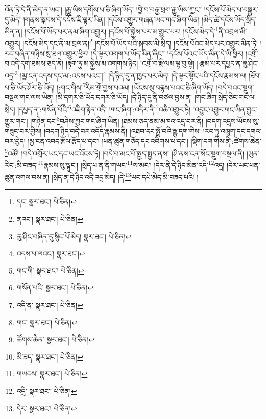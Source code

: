 འོན་ཏེ་དེ་ནི་མེད་ན་ཡང་། །རྒྱུ་ཡིས་དགོས་པ་ཅི་ཞིག་ཡོད། །བྱེ་བ་བརྒྱ་ཕྲག་རྒྱུ་ཡིས་ཀྱང་། །དངོས་པོ་མེད་པ་བསྒྱུར་དུ་མེད། །གནས་སྐབས་དེ་དངོས་ཇི་ལྟར་ཡིན། །དངོས་འགྱུར་གཞན་ཡང་གང་ཞིག་ཡིན། །མེད་ཚེ་དངོས་ཡོད་སྲིད་མིན་ན། །དངོས་པོ་ཡོད་པར་ནམ་ཞིག་འགྱུར། །དངོས་པོ་སྐྱེས་པར་མ་གྱུར་པར། །དངོས་མེད་དེ་\footnote{དང་  སྣར་ཐང་།  པེ་ཅིན། }ནི་འབྲལ་མི་འགྱུར། །དངོས་མེད་དང་ནི་མ་བྲལ་ན།\footnote{ནའང་།  སྣར་ཐང་།  པེ་ཅིན། } །དངོས་པོ་ཡོད་པའི་སྐབས་མི་སྲིད། །དངོས་པོའང་མེད་པར་འགྱུར་མིན་ཏེ། །རང་བཞིན་གཉིས་སུ་ཐལ་འགྱུར་ཕྱིར། །དེ་ལྟར་འགག་པ་ཡོད་མིན་ཞིང་། །དངོས་པོའང་ཡོད་མིན་དེ་ཡི་ཕྱིར། །འགྲོ་བ་འདི་དག་ཐམས་ཅད་ནི། །རྟག་ཏུ་མ་སྐྱེས་མ་འགགས་ཉིད། །འགྲོ་བ་རྨི་ལམ་ལྟ་བུ་སྟེ། །:རྣམ་པར་དཔྱད་ན་ཆུ་ཤིང་འདྲ།\footnote{ཆུ་ཤིང་བཞིན་དུ་སྙིང་པོ་མེད།  སྣར་ཐང་།  པེ་ཅིན། } །མྱ་ངན་འདས་དང་མ་:འདས་པའང་།\footnote{འདས་པ་ལའང་།  སྣར་ཐང་། } །དེ་ཉིད་དུ་ན་ཁྱད་པར་མེད། །དེ་ལྟར་སྟོང་པའི་དངོས་རྣམས་ལ། །ཐོབ་པ་ཅི་ཡོད་ཤོར་ཅི་ཡོད། །:གང་གིས་\footnote{གང་གི་  སྣར་ཐང་།  པེ་ཅིན། }རིམ་གྲོ་བྱས་པའམ། །ཡོངས་སུ་བརྙས་པའང་ཅི་ཞིག་ཡོད། །བདེ་བའང་སྡུག་བསྔལ་གང་ལས་ཡིན། །མི་དགར་ཅི་ཡོད་དགར་ཅི་ཡོད། །དེ་ཉིད་དུ་ནི་བཙལ་བྱས་ན། །གང་ཞིག་སྲེད་ཅིང་གང་ལ་སྲེད། །དཔྱད་ན་:གསོན་པོའི་\footnote{གསོན་པའི་  སྣར་ཐང་།  པེ་ཅིན། }འཇིག་རྟེན་འདི། །གང་ཞིག་:འདིར་ནི་\footnote{འདི་ན་  སྣར་ཐང་།  པེ་ཅིན། }འཆི་འགྱུར་ཏེ། །འབྱུང་འགྱུར་གང་ཡིན་བྱུང་གྱུར་གང་། །གཉེན་དང་\footnote{གང་  སྣར་ཐང་།  པེ་ཅིན། }བཤེས་ཀྱང་གང་ཞིག་ཡིན། །ཐམས་ཅད་ནམ་མཁའ་འདྲ་བར་ནི། །བདག་འདྲས་ཡོངས་སུ་གཟུང་བར་གྱིས། །བདག་ཉིད་བདེ་བར་འདོད་རྣམས་ནི། །འཐབ་དང་སྤྲོ་བའི་རྒྱུ་དག་གིས། །རབ་ཏུ་འཁྲུག་དང་དགའ་བར་བྱེད། །མྱ་ངན་འབད་རྩོལ་རྩོད་པ་དང་། །ཕན་ཚུན་གཅོད་དང་འབིགས་པ་དང་། །སྡིག་དག་གིས་ནི་:ཚེགས་ཆེན་\footnote{ཚོགས་ཆེན་  སྣར་ཐང་།  པེ་ཅིན། }འཚོ། །བདེ་འགྲོར་ཡང་དང་ཡང་འོངས་ཏེ། །བདེ་བ་མང་པོ་སྤྱད་སྤྱད་ནས། །ཤི་ནས་ངན་སོང་སྡུག་བསྔལ་ནི། །ཡུན་རིང་:མི་བཟད་\footnote{མི་ཟད་  སྣར་ཐང་།  པེ་ཅིན། }རྣམས་སུ་ལྟུང་། །སྲིད་པ་ན་ནི་གཡང་\footnote{གཡངས་  སྣར་ཐང་།  པེ་ཅིན། }ས་མང་། །དེར་ནི་དེ་ཉིད་མིན་འདི་\footnote{འདྲི་  སྣར་ཐང་།  པེ་ཅིན། }འདྲ། །དེར་ཡང་ཕན་ཚུན་འགལ་བས་ན། །སྲིད་ན་དེ་ཉིད་འདི་འདྲ་མེད། །དེ་\footnote{དེར་  སྣར་ཐང་།  པེ་ཅིན། }ཡང་དཔེ་མེད་མི་བཟད་པའི། །
